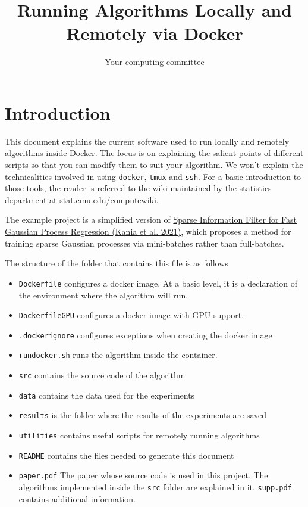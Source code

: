 \documentclass[12pt, letterpaper, onecolumn]{article}
\title{Running Algorithms Locally and Remotely via Docker}
\author[1]{Your computing committee}
\date{}
\begin{document}
\maketitle

\tableofcontents

\pagebreak

\section{Introduction}

This document explains the current software used to run locally and remotely algorithms inside Docker. The focus is on explaining the salient points of different scripts so that you can modify them to suit your algorithm. We won't explain the technicalities involved in using \texttt{docker}, \texttt{tmux} and \texttt{ssh}. For a basic introduction to those tools, the reader is referred to the wiki maintained by the statistics department at \href{https://www.stat.cmu.edu/computewiki/index.php}{stat.cmu.edu/computewiki}.

The example project is a simplified version of \href{https://doi.org/10.1007/978-3-030-86523-8_32}{Sparse Information Filter for Fast Gaussian Process Regression (Kania et al. 2021)}, which proposes a method for training sparse Gaussian processes via mini-batches rather than full-batches.   

The structure of the folder that contains this file is as follows \begin{itemize}
	\item \texttt{Dockerfile} configures a docker image. At a basic level, it is a declaration of the environment where the algorithm will run.
	\item \texttt{DockerfileGPU} configures a docker image with GPU support.
	\item \texttt{.dockerignore} configures exceptions when creating the docker image
	\item \texttt{rundocker.sh} runs the algorithm inside the container.
	\item \texttt{src} contains the source code of the algorithm
	\item \texttt{data} contains the data used for the experiments
	\item \texttt{results} is the folder where the results of the experiments are saved
	\item \texttt{utilities} contains useful scripts for remotely running algorithms
	\item \texttt{README} contains the files needed to generate this document
	\item \texttt{paper.pdf} The paper whose source code is used in this project. The algorithms implemented inside the \texttt{src} folder are explained in it. \texttt{supp.pdf} contains additional information.
\end{itemize}
\end{document}
